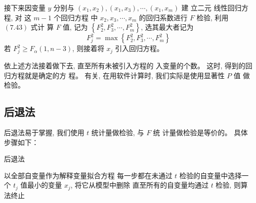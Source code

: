 接下来因变量 \( y \) 分别与 \( \left(x_{1}, x_{2}\right),\left(x_{1}, x_{3}\right), \cdots,\left(x_{1}, x_{m}\right) \) 建
立二元 线性回归方程, 对 这 \( {m}-{1} \) 个回归方程 中 \( x_{2}, x_{3}, \cdots, x_{m} \) 的回归系数进行 \( F \) 检验, 利用 \( (7.43) \) 式计 算 \( {F} \) 值, 记为 \( \left\{{F}_{2}^{2}, {F}_{3}^{2}, \cdots, {F}_{m}^{2}\right\} \), 选其最大者记为
$$
F_{j}^{2}=\max \left\{F_{2}^{2}, F_{3}^{2}, \cdots, F_{m}^{2}\right\}
$$
若 \( {F}_{j}^{2} \geq {F}_{\alpha} {( 1 , n - 3 )} \), 则接着将 \( {x}_{{j}} \) 引入回归方程。 

依上述方法接着做下去, 直至所有未被引入方程的
入变量的个数。 这时, 得到的回归方程就是确定的方
程。 
有关, 在用软件计算时, 我们实际是使用显著性 \( {P} \) 值
做检验。 

\subsection{后退法}

后退法易于掌握, 我们使用 \( t \) 统计量做检验, 与 \( {F} \) 统
计量做检验是等价的。 具体步骤如下：

\begin{algorithm}
    \caption{后退法}
    以全部自变量作为解释变量拟合方程\;
    每一步都在未通过 \( {t} \) 检验的自变量中选择一个
\( {t}_{j} \) 值最小的变量 \( {x}_{j} \), 将它从模型中删除\;
    直至所有的自变量均通过 \( {t} \) 检验, 则算法终止\;
\end{algorithm}
